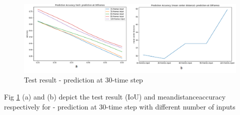 


\begin{figure}[H] 
\includegraphics[scale=0.6]{Phase2-accuracy}
\begin{center}
\caption{Test result - prediction at 30-time step}
\label{Phase2-accuracy}
\end{center}
\end{figure}

Fig \ref{Phase2-accuracy} (a) and (b) depict the test result (IoU) and mean\textunderscore distance\textunderscore accuracy respectively for - prediction at 30-time step with different number of inputs




